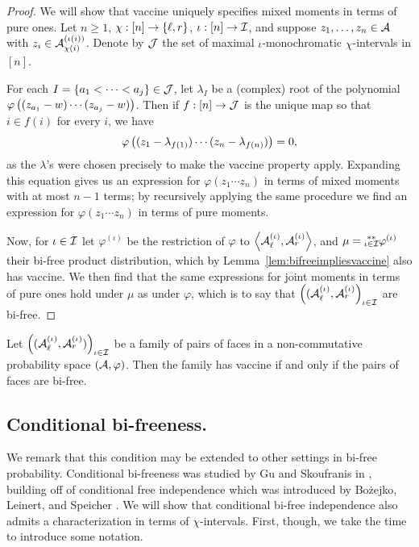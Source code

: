 \begin{proof}
	We will show that vaccine uniquely specifies mixed moments in terms of pure ones.
	Let $n \geq 1$, $\chi : [n] \to \left\{\ell, r\right\}$, $\iota : [n] \to \mathcal{I}$, and suppose $z_1, \ldots, z_n \in \mathcal{A}$ with $z_i \in \mathcal{A}_{\chi(i)}^{(\iota(i))}$.
	Denote by $\mathcal{J}$ the set of maximal $\iota$-monochromatic $\chi$-intervals in $[n]$.

	For each $I = \left\{a_1 < \cdots < a_j\right\} \in \mathcal{J}$, let $\lambda_I$ be a (complex) root of the polynomial $\varphi\left((z_{a_1} - w)\cdots (z_{a_j} - w)\right)$.
	Then if $f : [n] \to \mathcal{J}$ is the unique map so that $i \in f(i)$ for every $i$, we have
	$$\varphi\left((z_1 - \lambda_{f(1)})\cdots(z_n-\lambda_{f(n)})\right) = 0,$$
	as the $\lambda$'s were chosen precisely to make the vaccine property apply.
	Expanding this equation gives us an expression for $\varphi(z_1\cdots z_n)$ in terms of mixed moments with at most $n-1$ terms; by recursively applying the same procedure we find an expression for $\varphi(z_1\cdots z_n)$ in terms of pure moments.

	Now, for $\iota \in \mathcal{I}$ let $\varphi^{(\iota)}$ be the restriction of $\varphi$ to $\left\langle\mathcal{A}_\ell^{(\iota)}, \mathcal{A}_r^{(\iota)}\right\rangle$, and $\mu = \substack{**\\ \iota \in \mathcal{I}}\varphi^{(\iota)}$ their bi-free product distribution, which by Lemma~\ref{lem:bifreeimpliesvaccine} also has vaccine.
	We then find that the same expressions for joint moments in terms of pure ones hold under $\mu$ as under $\varphi$, which is to say that $\left((\mathcal{A}_\ell^{(\iota)}, \mathcal{A}_r^{(\iota)}\right)_{\iota\in\mathcal{I}}$ are bi-free.
\end{proof}

\begin{theorem}
	Let $\left((\mathcal{A}_\ell^{(\iota)}, \mathcal{A}_r^{(\iota)})\right)_{\iota \in \mathcal{I}}$ be a family of pairs of faces in a non-commutative probability space $(\mathcal{A}, \varphi)$.
	Then the family has vaccine{} if and only if the pairs of faces are bi-free.
\end{theorem}


\subsection{Conditional bi-freeness.}
\label{ss:condbifree}
We remark that this condition may be extended to other settings in bi-free probability.
Conditional bi-freeness was studied by Gu and Skoufranis in \cite{gu2016conditionally}, building off of conditional free independence which was introduced by Bo\.zejko, Leinert, and Speicher \cite{bozejko1996convolution}.
We will show that conditional bi-free independence also admits a characterization in terms of $\chi$-intervals.
First, though, we take the time to introduce some notation.

